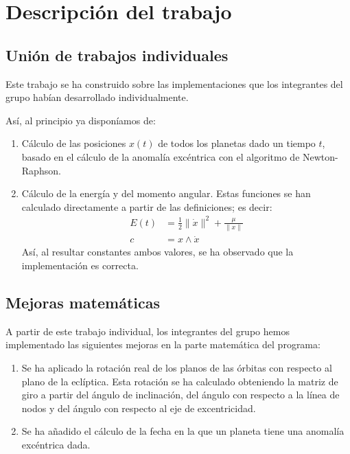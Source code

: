 \documentclass[a4paper, 11pt]{article}
\begin{document}
  \section{Descripción del trabajo}
  \subsection{Unión de trabajos individuales}
  Este trabajo se ha construido sobre las implementaciones que los integrantes del grupo habían desarrollado individualmente.

  Así, al principio ya disponíamos de:
  \begin{enumerate}
      \item Cálculo de las posiciones $x(t)$ de todos los planetas dado un tiempo $t$, basado en el cálculo de la anomalía excéntrica con el algoritmo de Newton-Raphson.
      \item Cálculo de la energía y del momento angular. Estas funciones se han calculado directamente a partir de las definiciones; es decir:
      \begin{align*}
          E(t) &= \frac{1}{2}\lVert\dot{x}\rVert^2 + \frac{\mu}{\lVert x\rVert} \\
          c &= x \wedge \dot{x}
      \end{align*}
      Así, al resultar constantes ambos valores, se ha observado que la implementación es correcta.
  \end{enumerate}

  \subsection{Mejoras matemáticas}

  A partir de este trabajo individual, los integrantes del grupo hemos implementado las siguientes mejoras en la parte matemática del programa:

  \begin{enumerate}
      \item Se ha aplicado la rotación real de los planos de las órbitas con respecto al plano de la eclíptica. Esta rotación se ha calculado obteniendo la matriz de giro a partir del ángulo de inclinación, del ángulo con respecto a la línea de nodos y del ángulo con respecto al eje de excentricidad.
      \item Se ha añadido el cálculo de la fecha en la que un planeta tiene una anomalía excéntrica dada.
  \end{enumerate}
\end{document}
